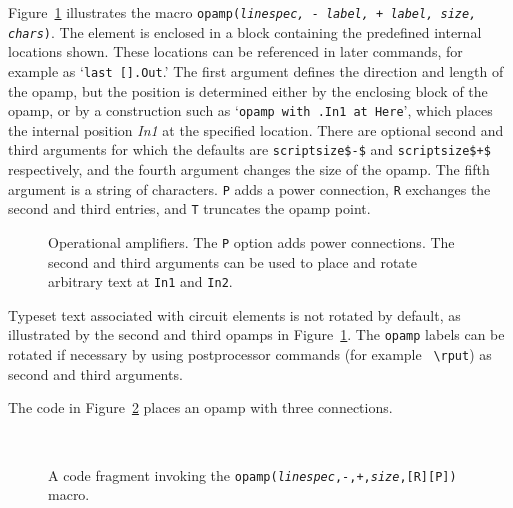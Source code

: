 Figure~\ref{Opamp} illustrates the macro
{\tt opamp({\sl linespec, - label, + label, size,} {\sl chars})}\label{OPAMP}.
The element is enclosed in a block
containing the predefined internal locations shown.
These locations can be referenced in later
commands, for example as `{\tt last [].Out}.'
The first argument defines the direction and length of the opamp, but the
position is determined either by the enclosing block of the opamp,
or by a construction such as `{\tt opamp with .In1 at Here}', which places
the internal position {\sl In1} at the specified location.
There are optional second and third arguments for which the defaults
are {\tt {}scriptsize\$-\$} and {\tt {}scriptsize\$+\$}
respectively, and the fourth argument changes the size of the opamp.
The fifth argument is a string of characters.  {\tt P}
adds a power connection, {\tt R} exchanges the second and
third entries, and {\tt T} truncates the opamp point.

\begin{figure}[h!t]
   
   \caption{Operational amplifiers.  The {\tt P} option adds
     power connections.  The second and third arguments can be used
     to place and rotate arbitrary text at {\tt In1} and {\tt In2}.}
   \label{Opamp}
   \end{figure}

Typeset text associated with circuit elements is not rotated by default,
as illustrated by the second and third opamps in Figure~\ref{Opamp}.
The {\tt opamp} labels can be rotated if necessary by 
using postprocessor commands (for example \PSTricks\ \verb|\rput|)
as second and third arguments.

The code in Figure~\ref{oax} places an opamp with three connections.
\begin{figure}[h!t]
   \parbox{4in}{\small }%
   \quad\raise-0.2in\hbox{ }%
   \vspace{-\baselineskip}
   \caption{A code fragment invoking the
    {\tt opamp({\sl linespec},-,+,{\sl size},[R][P])} macro.}
   \label{oax}
   \end{figure}

